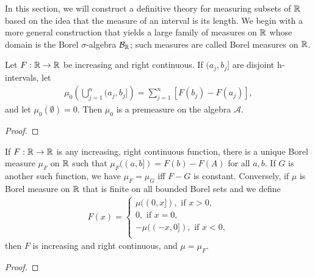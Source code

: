 In this section, we will construct a definitive theory for measuring subsets of $\mathbb{R}$ based on the idea that the measure of an interval is its length.
We begin with a more general construction that yields a large family of measures on $\mathbb{R}$ whose domain is the Borel $\sigma$-algebra $\mathcal{B}_{\mathbb{R}}$; such measures are called Borel measures on $\mathbb{R}$.

\begin{proposition}
    Let $F:\mathbb{R} \to \mathbb{R}$ be increasing and right continuous.
    If $(a_j, b_j]$ are disjoint h-intervals, let
    \begin{align}
        \mu_0 \left(\bigcup_{j=1}^{n} (a_j, b_j] \right) = \sum_{j=1}^{n} [F(b_j) - F(a_j)],
    \end{align}
    and let $\mu_0(\emptyset) = 0$.
    Then $\mu_0$ is a premeasure on the algebra $\mathcal{A}$.
\end{proposition}

\begin{proof}

\end{proof}

\begin{theorem}
    If $F: \mathbb{R} \to \mathbb{R}$ is any increasing, right continuous function, there is a unique Borel measure $\mu_F$ on $\mathbb{R}$ such that $\mu_F ((a,b]) = F(b) - F(A)$ for all $a, b$.
    If $G$ is another such function, we have $\mu_F = \mu_G$ iff $F-G$ is constant.
    Conversely, if $\mu$ is Borel measure on $\mathbb{R}$ that is finite on all bounded Borel sets and we define
    \begin{align}
        F(x) = \begin{cases}
            \mu((0, x]), \text{ if } x > 0, \\
            0, \text{ if } x = 0,\\
            -\mu((-x, 0]), \text{ if } x < 0, \\
        \end{cases}
    \end{align}
    then $F$ is increasing and right continuous, and $\mu = \mu_F$.
\end{theorem}

\begin{proof}
    
\end{proof}

